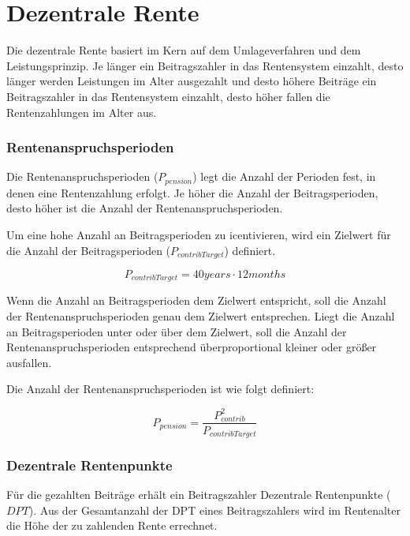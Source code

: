 \section{Dezentrale Rente}

Die dezentrale Rente basiert im Kern auf dem Umlageverfahren und dem Leistungsprinzip.
Je länger ein Beitragszahler in das Rentensystem einzahlt, desto länger werden Leistungen 
im Alter ausgezahlt und desto höhere Beiträge ein Beitragszahler in das Rentensystem
einzahlt, desto höher fallen die Rentenzahlungen im Alter aus.

\subsubsection*{Rentenanspruchsperioden}

Die Rentenanspruchsperioden ($P_{pension}$) legt die Anzahl der Perioden fest,
in denen eine Rentenzahlung erfolgt. Je höher die Anzahl der Beitragsperioden, desto höher ist die Anzahl der Rentenanspruchsperioden.

Um eine hohe Anzahl an Beitragsperioden zu icentivieren, wird ein Zielwert 
für die Anzahl der Beitragsperioden ($P_{contribTarget}$) definiert. 

\begin{equation}
	P_{contribTarget} = 40 years \cdot 12 months
\end{equation}

Wenn die Anzahl an Beitragsperioden dem Zielwert entspricht, soll die Anzahl der 
Rentenanspruchsperioden genau dem Zielwert entsprechen. Liegt die  Anzahl an
Beitragsperioden unter oder über dem Zielwert, soll die Anzahl der 
Rentenanspruchsperioden entsprechend überproportional kleiner oder größer ausfallen.  

Die Anzahl der Rentenanspruchsperioden ist wie folgt definiert:

\begin{equation}
	P_{pension} = \frac{P_{contrib}^2}{P_{contribTarget}}
\end{equation}


\subsubsection*{Dezentrale Rentenpunkte}

Für die gezahlten Beiträge erhält ein Beitragszahler Dezentrale Rentenpunkte
($DPT$). Aus der Gesamtanzahl der DPT eines Beitragszahlers wird im Rentenalter
die Höhe der zu zahlenden Rente errechnet.

